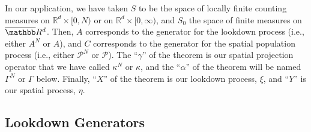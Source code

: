 \documentclass[EJP]{ejpecp} %
\renewcommand{\bar}{\overline}
\newcommand{\IR}{\mathbb R}
\newcommand{\Pgen}{\mathcal{P}}    %
\newcommand{\lp}{\xi}              %
\begin{document}
In our application, we have taken $S$ to be the space of locally finite counting measures
on $\IR^d \times [0,N)$ or on $\IR^d \times [0,\infty)$,
and $S_0$ the space of finite measures on $\bar \IR^d$.
Then, $A$ corresponds to the generator for the lookdown process (i.e., either $A^N$ or $A$),
and $C$ corresponds to the generator for the spatial population process
(i.e., either $\Pgen^N$ or $\Pgen$).
The ``$\gamma$'' of the theorem is our spatial projection operator
that we have called $\kappa^N$ or $\kappa$,
and the ``$\alpha$'' of the theorem will be named $\Gamma^N$ or $\Gamma$ below.
Finally, ``$X$'' of the theorem is our lookdown process, $\lp$,
and ``$Y$'' is our spatial process, $\eta$.

\subsection{Lookdown Generators}
\end{document}
